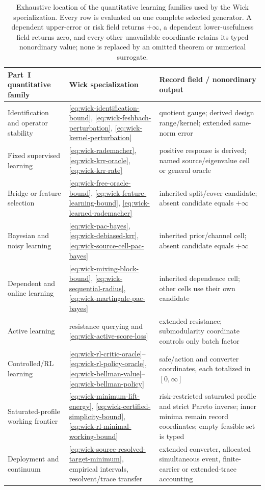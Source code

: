 \documentclass[11pt]{article}
\numberwithin{section}{part}
\theoremstyle{plain}
\theoremstyle{definition}
\theoremstyle{remark}
\begin{document}
\begin{table}[tbp]
\centering
\small
\begin{tabular}{@{}p{.22\linewidth}p{.36\linewidth}p{.32\linewidth}@{}}
\toprule
Part~I quantitative family & Wick specialization & Record field / nonordinary output\\
\midrule
Identification and operator stability
& \eqref{eq:wick-identification-bound},
  \eqref{eq:wick-feshbach-perturbation},
  \eqref{eq:wick-kernel-perturbation}
& quotient gauge; derived design range/kernel; extended same-norm error\\
Fixed supervised learning
& \eqref{eq:wick-rademacher}, \eqref{eq:wick-krr-oracle},
  \eqref{eq:wick-krr-rate}
& positive response is derived; named source/eigenvalue cell or general oracle\\
Bridge or feature selection
& \eqref{eq:wick-free-oracle-bound},
  \eqref{eq:wick-feature-learning-bound},
  \eqref{eq:wick-learned-rademacher}
& inherited split/cover candidate; absent candidate equals \(+\infty\)\\
Bayesian and noisy learning
& \eqref{eq:wick-pac-bayes}, \eqref{eq:wick-debiased-krr},
  \eqref{eq:wick-source-cell-pac-bayes}
& inherited prior/channel cell; absent candidate equals \(+\infty\)\\
Dependent and online learning
& \eqref{eq:wick-mixing-block-bound},
  \eqref{eq:wick-sequential-radius},
  \eqref{eq:wick-martingale-pac-bayes}
& inherited dependence cell; other cells use their own candidate\\
Active learning
& resistance querying and \eqref{eq:wick-active-score-loss}
& extended resistance; submodularity coordinate controls only batch factor\\
Controlled/RL learning
& \eqref{eq:wick-rl-critic-oracle}--
  \eqref{eq:wick-rl-policy-oracle},
  \eqref{eq:wick-bellman-value}--\eqref{eq:wick-bellman-policy}
& safe/action and converter coordinates, each totalized in \([0,\infty]\)\\
Saturated-profile working frontier
& \eqref{eq:wick-minimum-lift-energy},
  \eqref{eq:wick-certified-simplicity-bound},
  \eqref{eq:wick-rl-minimal-working-bound}
& risk-restricted saturated profile and strict Pareto inverse; inner minima
  remain record coordinates; empty feasible set is typed\\
Deployment and continuum
& \eqref{eq:wick-source-resolved-target-minimum}, empirical intervals,
  resolvent/trace transfer
& extended converter, allocated simultaneous event, finite-carrier or
  extended-trace accounting\\
\bottomrule
\end{tabular}
\caption{Exhaustive location of the quantitative learning families used by
the Wick specialization.  Every row is evaluated on one complete selected
generator.  A dependent upper-error or risk field returns \(+\infty\), a
dependent lower-usefulness field returns zero, and every other unavailable
coordinate retains its typed nonordinary value; none is replaced by an
omitted theorem or numerical surrogate.}
\label{tab:wick-quantitative-coverage}
\end{table}
\end{document}
